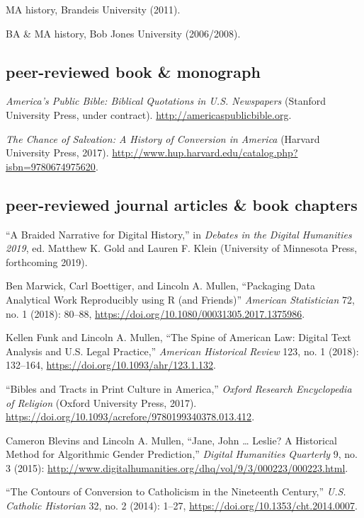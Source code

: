 \documentclass[11pt]{article}
\begin{document}
\vspace{0.05in}

MA history, Brandeis University (2011).

BA \& MA history, Bob Jones University (2006/2008).

\subsection{peer-reviewed book \& monograph}\label{books}

\emph{America's Public Bible: Biblical Quotations in U.S. Newspapers} 
(Stanford University Press, under contract). 
\url{http://americaspublicbible.org}.

\emph{The Chance of Salvation: A History of Conversion in America} (Harvard 
University Press, 2017). 
\url{http://www.hup.harvard.edu/catalog.php?isbn=9780674975620}.

\subsection{peer-reviewed journal articles \& book chapters}\label{peer-reviewed}

``A Braided Narrative for Digital History,'' in \emph{Debates in the Digital Humanities 2019}, ed. Matthew K. Gold and Lauren F. Klein (University of Minnesota Press, forthcoming 2019).

Ben Marwick, Carl Boettiger, and Lincoln A. Mullen, ``Packaging Data 
Analytical Work Reproducibly using R (and Friends)'' \emph{American 
Statistician} 72, no. 1 (2018): 80--88, \url{https://doi.org/10.1080/00031305.2017.1375986}.

Kellen Funk and Lincoln A. Mullen, ``The Spine of American Law: Digital Text Analysis and U.S. Legal Practice,'' \emph{American Historical Review} 123, no.  1 (2018): 132--164, \url{https://doi.org/10.1093/ahr/123.1.132}.

``Bibles and Tracts in Print Culture in America,'' \emph{Oxford Research Encyclopedia of Religion} (Oxford University Press, 2017). \url{ https://doi.org/10.1093/acrefore/9780199340378.013.412}.

Cameron Blevins and Lincoln A. Mullen, ``Jane, John \ldots{} Leslie? A Historical Method for Algorithmic Gender Prediction,'' \emph{Digital Humanities Quarterly} 9, no. 3 (2015): \url{http://www.digitalhumanities.org/dhq/vol/9/3/000223/000223.html}.

``The Contours of Conversion to Catholicism in the Nineteenth Century,'' \emph{U.S. Catholic Historian} 32, no. 2 (2014): 1--27, \url{https://doi.org/10.1353/cht.2014.0007}.
\end{document}
